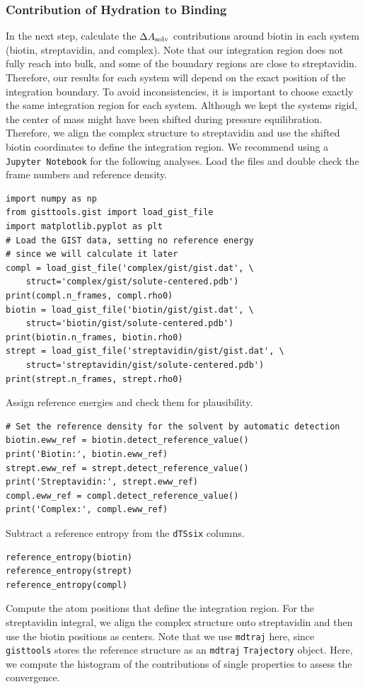 \documentclass[9pt,tutorial]{livecoms}
\newcommand{\dasolv}{\Delta A_\textup{solv}}
\newcommand{\software}{\texttt}
\newcommand\inlinecode{\texttt}
\begin{document}
\subsubsection{Contribution of Hydration to Binding}
\label{sec:binding_contributions}
In the next step, calculate the $\dasolv$ contributions around biotin in each system (biotin, streptavidin, and complex).
Note that our integration region does not fully reach into bulk, and some of the boundary regions are close to streptavidin. 
Therefore, our results for each system will depend on the exact position of the integration boundary. 
To avoid inconsistencies, it is important to choose exactly the same integration region for each system.
Although we kept the systems rigid, the center of mass might have been shifted during pressure equilibration.
Therefore, we align the complex structure to streptavidin and use the shifted biotin coordinates to define the integration region.
We recommend using a \software{Jupyter Notebook} for the following analyses.
Load the files and double check the frame numbers and reference density.
\begin{lstlisting}[style=python]
import numpy as np
from gisttools.gist import load_gist_file
import matplotlib.pyplot as plt
# Load the GIST data, setting no reference energy
# since we will calculate it later
compl = load_gist_file('complex/gist/gist.dat', \
    struct='complex/gist/solute-centered.pdb')
print(compl.n_frames, compl.rho0)
biotin = load_gist_file('biotin/gist/gist.dat', \
    struct='biotin/gist/solute-centered.pdb')
print(biotin.n_frames, biotin.rho0)
strept = load_gist_file('streptavidin/gist/gist.dat', \
    struct='streptavidin/gist/solute-centered.pdb')
print(strept.n_frames, strept.rho0)
\end{lstlisting}
Assign reference energies and check them for plausibility.

\begin{lstlisting}[style=python]
# Set the reference density for the solvent by automatic detection
biotin.eww_ref = biotin.detect_reference_value()
print('Biotin:', biotin.eww_ref)
strept.eww_ref = strept.detect_reference_value()
print('Streptavidin:', strept.eww_ref)
compl.eww_ref = compl.detect_reference_value()
print('Complex:', compl.eww_ref)
\end{lstlisting}
Subtract a reference entropy from the \inlinecode{dTSsix} columns.

\begin{lstlisting}[style=python]
reference_entropy(biotin)
reference_entropy(strept)
reference_entropy(compl)
\end{lstlisting}
Compute the atom positions that define the integration region.
For the streptavidin integral, we align the complex structure onto streptavidin and then use the biotin positions as centers. Note that we use \software{mdtraj} here, since \software{gisttools} stores the reference structure as an \software{mdtraj} \inlinecode{Trajectory} object.
Here, we compute the histogram of the contributions of single properties to assess the convergence.
\end{document}

